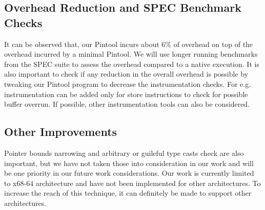 \subsection*{Overhead Reduction and SPEC Benchmark Checks}
It can be observed that, our Pintool incurs about 6\% of overhead on top of the overhead incurred by a minimal Pintool. We will use longer running benchmarks from the SPEC suite to assess the overhead compared to a native execution. It is also important to check if any reduction in the overall overhead is possible by tweaking our Pintool program to decrease the instrumentation checks. For e.g. instrumentation can be added only for store instructions to check for possible buffer overrun. If possible, other instrumentation tools can also be considered.

\subsection*{Other Improvements}
Pointer bounds narrowing and arbitrary or guileful type casts check are also important, but we have not taken those into consideration in our work and will be one priority in our future work considerations. Our work is currently limited to x68-64 architecture and have not been implemented for other architectures. To increase the reach of this technique, it can definitely be made to support other architectures.